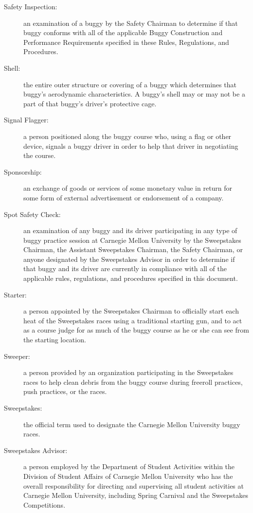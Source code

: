 \begin{description}
	\item[Safety Inspection:]
	an examination of a buggy by the Safety Chairman to determine if that buggy conforms with all of the applicable Buggy Construction and Performance Requirements specified in these Rules, Regulations, and Procedures.

	\item[Shell:]
	the entire outer structure or covering of a buggy which determines that buggy's aerodynamic characteristics. A buggy's shell may or may not be a part of that buggy's driver's protective cage.

	\item[Signal Flagger:]
	a person positioned along the buggy course who, using a flag or other device, signals a buggy driver in order to help that driver in negotiating the course.

	\item[Sponsorship:]
	an exchange of goods or services of some monetary value in return for some form of external advertisement or endorsement of a company.

	\item[Spot Safety Check:]
	an examination of any buggy and its driver participating in any type of buggy practice session at Carnegie Mellon University by the Sweepstakes Chairman, the Assistant Sweepstakes Chairman, the Safety Chairman, or anyone designated by the Sweepstakes Advisor in order to determine if that buggy and its driver are currently in compliance with all of the applicable rules, regulations, and procedures specified in this document.

	\item[Starter:]
	a person appointed by the Sweepstakes Chairman to officially start each heat of the Sweepstakes races using a traditional starting gun, and to act as a course judge for as much of the buggy course as he or she can see from the starting location.

	\item[Sweeper:]
	a person provided by an organization participating in the Sweepstakes races to help clean debris from the buggy course during freeroll practices, push practices, or the races.

	\item[Sweepstakes:]
	the official term used to designate the Carnegie Mellon University buggy races.

	\item[Sweepstakes Advisor:]
	a person employed by the Department of Student Activities within the Division of Student Affairs of Carnegie Mellon University who has the overall responsibility for directing and supervising all student activities at Carnegie Mellon University, including Spring Carnival and the Sweepstakes Competitions.


\end{description}
